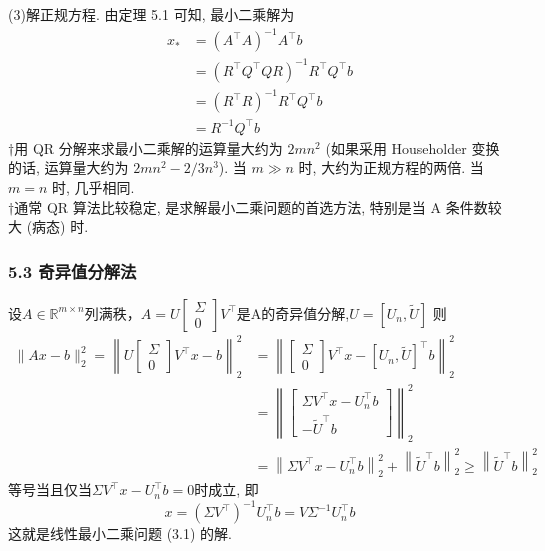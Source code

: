 \documentclass[notheorems,serif]{beamer}
\begin{document}
\begin{frame}
(3)解正规方程. 由定理 5.1 可知, 最小二乘解为
	$$
	\begin{aligned} x_{*} &=\left(A^{\top} A\right)^{-1} A^{\top} b \\ &=\left(R^{\top} Q^{\top} Q R\right)^{-1} R^{\top} Q^{\top} b \\ &=\left(R^{\top} R\right)^{-1} R^{\top} Q^{\top} b \\ &=R^{-1} Q^{\top} b \end{aligned}
	$$
$\dagger$用 QR 分解来求最小二乘解的运算量大约为 $2mn^{2}$ (如果采用 Householder 变换的话, 运算量大约为 $2mn^{2} - 2/3n^{3}$). 当 $m \gg n$ 时, 大约为正规方程的两倍. 当 $m = n$ 时, 几乎相同.\\
$\dagger$通常 QR 算法比较稳定, 是求解最小二乘问题的首选方法, 特别是当 A 条件数较大 (病态) 时.
\end{frame}

\begin{frame}
\frametitle{5.3 奇异值分解法}
设$A \in \mathbb{R}^{m \times n}$列满秩，$A=U\left[\begin{array}{l}{\Sigma} \\ {0}\end{array}\right] V^{\top}$是A的奇异值分解,$U=\left[U_{n}, \tilde{U}\right]$
则
$$
\begin{aligned}\|A x-b\|_{2}^{2}=\left\|U\left[\begin{array}{c}{\Sigma} \\ {0}\end{array}\right] V^{\top} x-b\right\|_{2}^{2} &=\left\|\left[\begin{array}{c}{\Sigma} \\ {0}\end{array}\right] V^{\top} x-\left[U_{n}, \tilde{U}\right]^{\top} b\right\|_{2}^{2} \\ &=\left\|\left[\begin{array}{c}{\Sigma V^{\top} x-U_{n}^{\top} b} \\ {-\tilde{U}^{\top} b}\end{array}\right]\right\|_{2}^{2} \\ &=\left\|\Sigma V^{\top} x-U_{n}^{\top} b\right\|_{2}^{2}+\left\|\tilde{U}^{\top} b\right\|_{2}^{2} \geq\left\|\tilde{U}^{\top} b\right\|_{2}^{2} \end{aligned}
$$
等号当且仅当$\Sigma V^{\top} x-U_{n}^{\top} b=0$时成立, 即
$$
x=\left(\Sigma V^{\top}\right)^{-1} U_{n}^{\top} b=V \Sigma^{-1} U_{n}^{\top} b
$$
这就是线性最小二乘问题 (3.1) 的解.
\end{frame}
\end{document}
